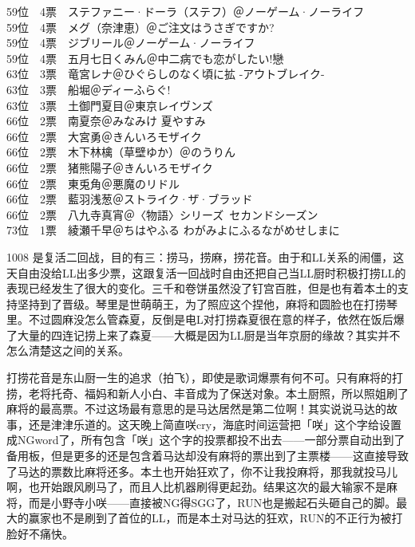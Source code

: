 {    59位　4票　ステファニー·ドーラ（ステフ）＠ノーゲーム·ノーライフ\\
    59位　4票　メグ（奈津恵）＠ご注文はうさぎですか?\\
    59位　4票　ジブリール＠ノーゲーム·ノーライフ\\
    59位　4票　五月七日くみん＠中二病でも恋がしたい!戀\\
    63位　3票　竜宮レナ＠ひぐらしのなく頃に拡 -アウトブレイク-\\
    63位　3票　船堀＠ディーふらぐ!\\
    63位　3票　土御門夏目＠東京レイヴンズ\\
    66位　2票　南夏奈＠みなみけ 夏やすみ\\
    66位　2票　大宮勇＠きんいろモザイク\\
    66位　2票　木下林檎（草壁ゆか）＠のうりん\\
    66位　2票　猪熊陽子＠きんいろモザイク\\
    66位　2票　東兎角＠悪魔のリドル\\
    66位　2票　藍羽浅葱＠ストライク·ザ·ブラッド\\
    66位　2票　八九寺真宵＠〈物語〉シリーズ~セカンドシーズン\\
    73位　1票　綾瀬千早＠ちはやふる わがみよにふるながめせしまに
}

1008 是复活二回战，目的有三：捞马，捞麻，捞花音。由于和LL关系的闹僵，这天自由没给LL出多少票，这跟复活一回战时自由还把自己当LL厨时积极打捞LL的表现已经发生了很大的变化。三千和卷饼虽然没了钉宫百胜，但是也有着本土的支持坚持到了晋级。琴里是世萌萌王，为了照应这个捏他，麻将和圆脸也在打捞琴里。不过圆麻没怎么管森夏，反倒是电L对打捞森夏很在意的样子，依然在饭后爆了大量的四连记捞上来了森夏——大概是因为LL厨是当年京厨的缘故？其实并不怎么清楚这之间的关系。

打捞花音是东山厨一生的追求（拍飞），即使是歌词爆票有何不可。只有麻将的打捞，老将托奇、福妈和新人小白、丰音成为了保送对象。本土厨照，所以照姐刷了麻将的最高票。不过这场最有意思的是马达居然是第二位啊！其实说说马达的故事，还是津津乐道的。这天晚上简直咲cry，海底时间运营把「咲」这个字给设置成NGword了，所有包含「咲」这个字的投票都投不出去——一部分票自动出到了备用板，但是更多的还是包含着马达却没有麻将的票出到了主票楼——这直接导致了马达的票数比麻将还多。本土也开始狂欢了，你不让我投麻将，那我就投马儿啊，也开始跟风刷马了，而且人比机器刷得更起劲。结果这次的最大输家不是麻将，而是小野寺小咲——直接被NG得SGG了，RUN也是搬起石头砸自己的脚。最大的赢家也不是刷到了首位的LL，而是本土对马达的狂欢，RUN的不正行为被打脸好不痛快。

